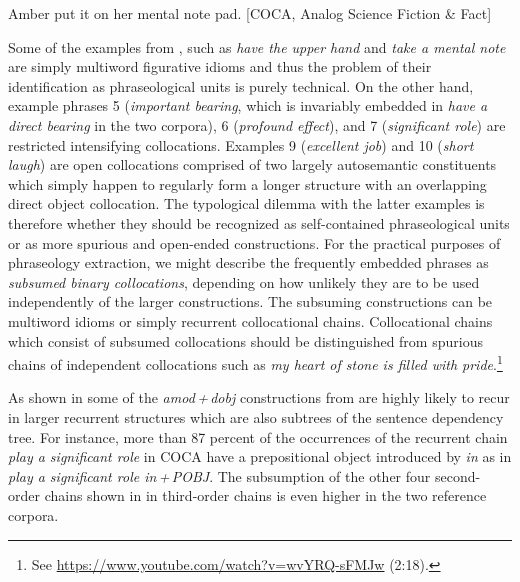 \documentclass[output=paper]{langscibook}
\begin{document}
\ea
Amber put it on her mental note pad. [COCA, Analog Science Fiction \& Fact] 
\z

Some of the examples from , such as \textit{have the upper hand} and \textit{take a mental note} are simply multiword figurative idioms and thus the problem of their identification as phraseological units is purely technical. On the other hand, example phrases 5 (\textit{important bearing}, which is invariably embedded in \textit{have a direct bearing} in the two corpora), 6 (\textit{profound effect}), and 7 (\textit{significant role}) are restricted intensifying collocations. Examples 9 (\textit{excellent job}) and 10 (\textit{short laugh}) are open collocations comprised of two largely autosemantic constituents which simply happen to regularly form a longer structure with an overlapping direct object collocation. The typological dilemma with the latter examples is therefore whether they should be recognized as self-contained phraseological units or as more spurious and open-ended constructions. For the practical purposes of phraseology extraction, we might describe the frequently embedded phrases as \textit{subsumed binary collocations}, depending on how unlikely they are to be used independently of the larger constructions. The subsuming constructions can be multiword idioms or simply recurrent collocational chains. Collocational chains which consist of subsumed collocations should be distinguished from spurious chains of independent collocations such as \textit{my heart of stone is filled with pride}.\footnote{See \url{https://www.youtube.com/watch?v=wvYRQ-sFMJw} (2:18).}

As shown in  some of the \textit{amod\,+\,dobj} constructions from  are highly likely to recur in larger recurrent structures which are also subtrees of the sentence dependency tree. For instance, more than 87 percent of the occurrences of the recurrent chain \textit{play a significant role} in COCA have a prepositional object introduced by \textit{in} as in \textit{play a significant role in\,+\,POBJ}. The subsumption of the other four second-order chains shown in  in third-order chains is even higher in the two reference corpora.
\end{document}

